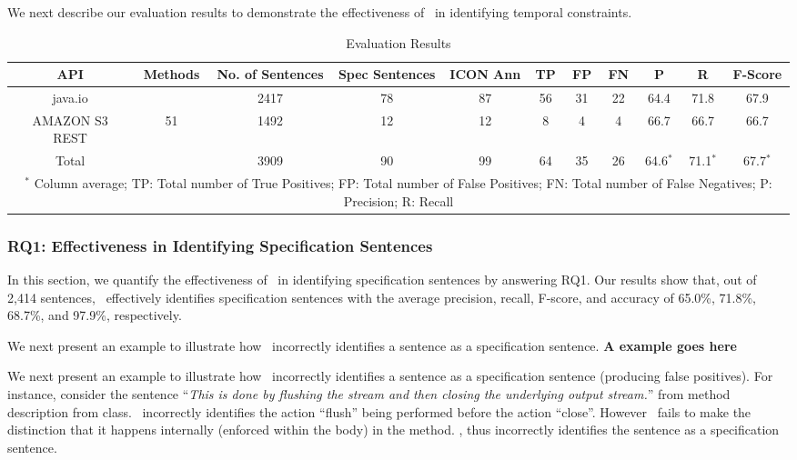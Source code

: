 We next describe our evaluation results to demonstrate the effectiveness of \tool\ in identifying temporal constraints.

\begin{table*}
\begin{center}

\caption{Evaluation Results}

\begin{tabular}{|c|c|c|c|c|c|c|c|c|c|c|}
\hline API & Methods & No. of Sentences & Spec Sentences & ICON Ann & TP & FP & FN & P & R & F-Score \\ 
\hline java.io &  & 2417 & 78 & 87 & 56 & 31 & 22 & 64.4 & 71.8 & 67.9 \\ 
\hline AMAZON S3 REST & 51 & 1492 & 12 & 12 & 8 & 4 & 4 & 66.7 & 66.7 & 66.7 \\ 
\hline Total &  & 3909 & 90 & 99 & 64 & 35 & 26 & 64.6$^*$ & 71.1$^*$ & 67.7$^*$ \\ 
\hline
\multicolumn{11}{p{6.5in}}{\footnotesize $^*$ Column average; TP: Total number of True Positives; 
FP: Total number of False Positives; FN: Total number of False Negatives; P: Precision; R: Recall} \\ 
\end{tabular}
\end{center}
\end{table*}


\subsubsection{RQ1: Effectiveness in Identifying Specification Sentences}


In this section, we quantify the effectiveness of \tool\ in identifying specification sentences by answering RQ1. Our results show that, out of 2,414 sentences, \tool\ effectively identifies specification sentences with the average precision, recall, F-score, and accuracy of 65.0\%, 71.8\%, 68.7\%, and 97.9\%, respectively.

We next present an example to illustrate how \tool\ incorrectly identifies a sentence as a specification sentence. \textbf{A example goes here}

We next present an example to illustrate how \tool\ incorrectly identifies a sentence as a specification sentence (producing false positives). For instance, consider the sentence ``\textit{This is done by flushing the stream and then closing the underlying output stream.}'' from   method description from  class. \tool\ incorrectly identifies the action ``flush'' being performed before the action ``close''. However \tool\ fails to make the distinction that it happens internally (enforced within the body) in the method. \tool, thus incorrectly identifies the sentence as a specification sentence.   


